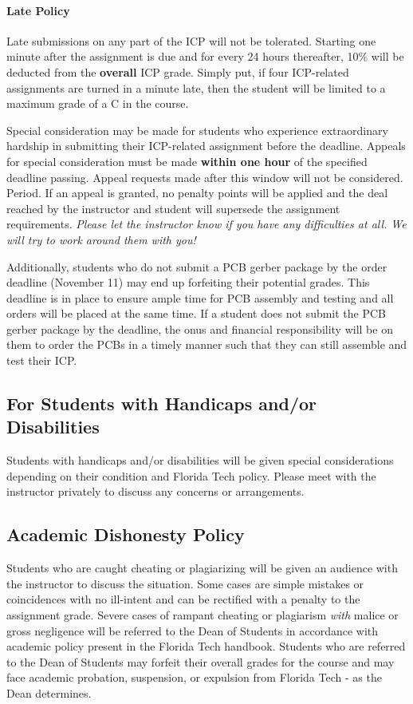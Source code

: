     \paragraph*{Late Policy} Late submissions on any part of the ICP will not be tolerated. Starting one minute after the assignment is due and for every 24 hours thereafter, 10\% will be deducted from the \textbf{overall} ICP grade.
    Simply put, if four ICP-related assignments are turned in a minute late, then the student will be limited to a maximum grade of a C in the course.

    Special consideration may be made for students who experience extraordinary hardship in submitting their ICP-related assignment before the deadline.
    Appeals for special consideration must be made \textbf{within one hour} of the specified deadline passing. 
    Appeal requests made after this window will not be considered. Period.
    If an appeal is granted, no penalty points will be applied and the deal reached by the instructor and student will supersede the assignment requirements. 
    \emph{Please let the instructor know if you have any difficulties at all.
    We will try to work around them with you!}
    
    Additionally, students who do not submit a PCB gerber package by the order deadline (November 11) may end up forfeiting their potential grades.
    This deadline is in place to ensure ample time for PCB assembly and testing and all orders will be placed at the same time.
    If a student does not submit the PCB gerber package by the deadline, the onus and financial responsibility will be on them to order the PCBs in a timely manner such that they can still assemble and test their ICP.

    \subsection*{For Students with Handicaps and/or Disabilities}
    Students with handicaps and/or disabilities will be given special considerations depending on their condition and Florida Tech policy. Please meet with the instructor privately to discuss any concerns or arrangements. 

    \subsection*{Academic Dishonesty Policy}
    Students who are caught cheating or plagiarizing will be given an audience with the instructor to discuss the situation. 
    Some cases are simple mistakes or coincidences with no ill-intent and can be rectified with a penalty to the assignment grade.
    Severe cases of rampant cheating or plagiarism \emph{with} malice or gross negligence will be referred to the Dean of Students in accordance with academic policy present in the Florida Tech handbook.
    Students who are referred to the Dean of Students may forfeit their overall grades for the course and may face academic probation, suspension, or expulsion from Florida Tech - as the Dean determines.
    
